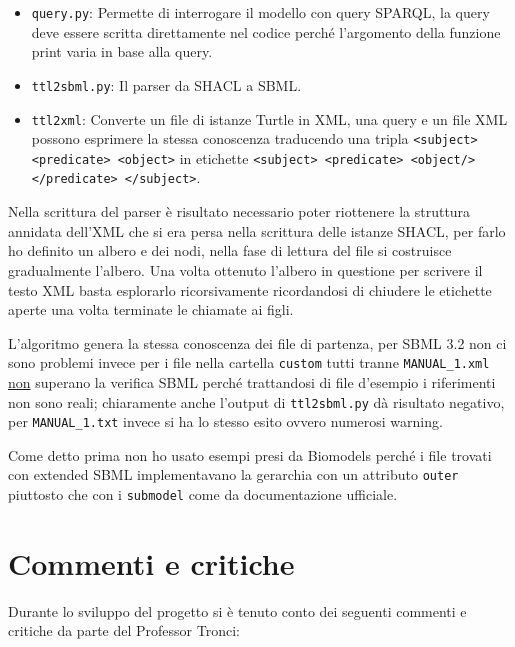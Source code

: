 \documentclass{article}
\begin{document}
\begin{itemize}
    \item \texttt{query.py}: Permette di interrogare il modello con query SPARQL, la query deve essere scritta direttamente nel codice perché l'argomento della funzione print varia in base alla query.
    \item \texttt{ttl2sbml.py}: Il parser da SHACL a SBML.
    \item \texttt{ttl2xml}: Converte un file di istanze Turtle in XML, una query e un file XML possono esprimere la stessa conoscenza traducendo una tripla \texttt{<subject> <predicate> <object>} in etichette \texttt{<subject> <predicate> <object/> </predicate> </subject>}.
\end{itemize}

Nella scrittura del parser è risultato necessario poter riottenere la struttura annidata dell'XML che si era persa nella scrittura delle istanze SHACL, per farlo ho definito un albero e dei nodi, nella fase di lettura del file si costruisce gradualmente l'albero. Una volta ottenuto l'albero in questione per scrivere il testo XML basta esplorarlo ricorsivamente ricordandosi di chiudere le etichette aperte una volta terminate le chiamate ai figli. 

L'algoritmo genera la stessa conoscenza dei file di partenza, per SBML 3.2 non ci sono problemi invece per i file nella cartella \texttt{custom} tutti tranne \texttt{MANUAL\_1.xml} \underline{non} superano la verifica SBML perché trattandosi di file d'esempio i riferimenti non sono reali; chiaramente anche l'output di \texttt{ttl2sbml.py} dà risultato negativo, per \texttt{MANUAL\_1.txt} invece si ha lo stesso esito ovvero numerosi warning.

Come detto prima non ho usato esempi presi da Biomodels perché i file trovati con extended SBML implementavano la gerarchia con un attributo \texttt{outer} piuttosto che con i \texttt{submodel} come da documentazione ufficiale.

\section{Commenti e critiche}
Durante lo sviluppo del progetto si è tenuto conto dei seguenti commenti e critiche da parte del Professor Tronci:
\end{document}
